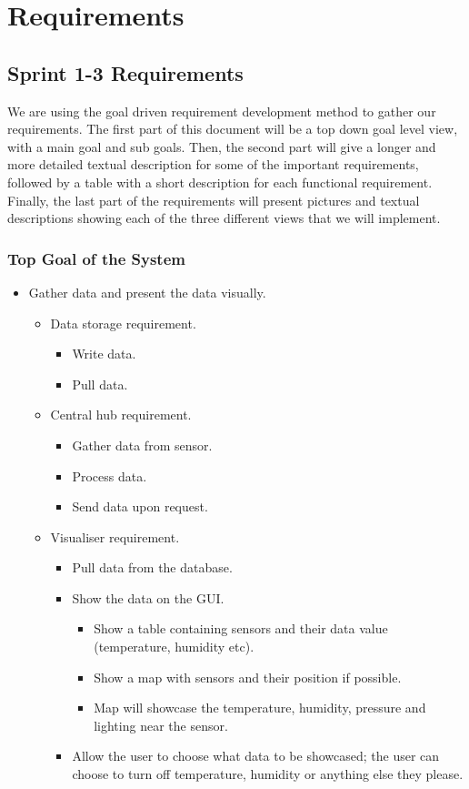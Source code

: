 \documentclass[../document]{subfiles}
\begin{document}
\section{Requirements}
\label{requirements}

\subsection{Sprint 1-3 Requirements}

We are using the goal driven requirement development method to gather our requirements. The first part of this document will be a top down goal level view, with a main goal and sub goals. Then, the second part will give a longer and more detailed textual description for some of the important requirements, followed by a table with a short description for each functional requirement. Finally, the last part of the requirements will present pictures and textual descriptions showing each of the three different views that we will implement.

\subsubsection{Top Goal of the System}
\begin{itemize}
\item
Gather data and present the data visually.
\begin{itemize}
\item
Data storage requirement.
\begin{itemize}
\item
Write data.
\item
Pull data.
\end{itemize}
\item
Central hub requirement.
\begin{itemize}
\item
Gather data from sensor.
\item
Process data.
\item
Send data upon request.
\end{itemize}
\item
Visualiser requirement.
\begin{itemize}
\item
Pull data from the database.
\item
Show the data on the GUI.
\begin{itemize}
\item
Show a table containing sensors and their data value (temperature, humidity etc).
\item
Show a map with sensors and their position if possible.
\item
Map will showcase the temperature, humidity, pressure and lighting near the sensor.
\end{itemize}
\item
Allow the user to choose what data to be showcased; the user can choose to turn off temperature, humidity or anything else they please.
\end{itemize}
\end{itemize}
\end{itemize}
\end{document}
